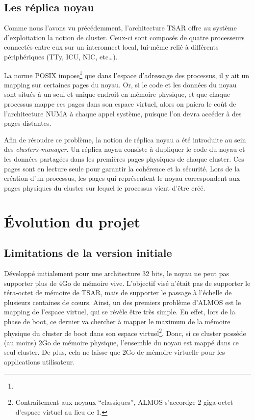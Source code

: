       
    \subsection{Les réplica noyau}

      Comme nous l'avons vu précédemment, l'architecture TSAR offre au système
      d'exploitation la notion de cluster. Ceux-ci sont composés de quatre
      processeurs connectés entre eux sur un interonnect local, lui-même relié à
      différents périphériques (TTy, ICU, NIC, etc\ldots).
      
      La norme POSIX impose\footnote{} que dans l'espace
      d'adressage des processus, il y ait un mapping sur certaines pages du
      noyau. Or, si le code et les données du noyau sont situés à un seul et
      unique endroit en mémoire physique, et que chaque processus mappe ces
      pages dans son espace virtuel, alors on paiera le coût de l'architecture
      NUMA à chaque appel système, puisque l'on devra accéder à des pages
      distantes.

      Afin de résoudre ce problème, la notion de réplica noyau a été introduite
      au sein des \textit{clusters-manager}. Un réplica noyau consiste à
      dupliquer le code du noyau et les données partagées dans les premières
      pages physiques de chaque cluster. Ces pages sont en lecture seule pour
      garantir la cohérence et la sécurité. Lors de la création d'un processus,
      les pages qui représentent le noyau correspondent aux pages physiques du
      cluster sur lequel le processus vient d'être créé.


  \section{Évolution du projet}

    \subsection{Limitations de la version initiale}
    
      Développé initialement pour une architecture 32 bits, le noyau ne peut pas
      supporter plus de 4Go de mémoire vive. L'objectif visé n'était pas de
      supporter le téra-octet de mémoire de TSAR, mais de supporter le passage à
      l'échelle de plusieurs centaines de c\oe urs. Ainsi, un des premiers
      problème d'ALMOS est le mapping de l'espace virtuel, qui se révèle être
      très simple. En effet, lors de la phase de boot, ce dernier va chercher à
      mapper le maximum de la mémoire physique du cluster de boot dans son
      espace virtuel\footnote{Contraitement aux noyaux ``classiques'', ALMOS
        s'accordge 2 giga-octet d'espace virtuel au lieu de 1.}. Donc, si ce
      cluster possède (au moins) 2Go de mémoire physique, l'ensemble du noyau
      est mappé dans ce seul cluster. De plus, cela ne laisse que 2Go de mémoire
      virtuelle pour les applications utilisateur.

